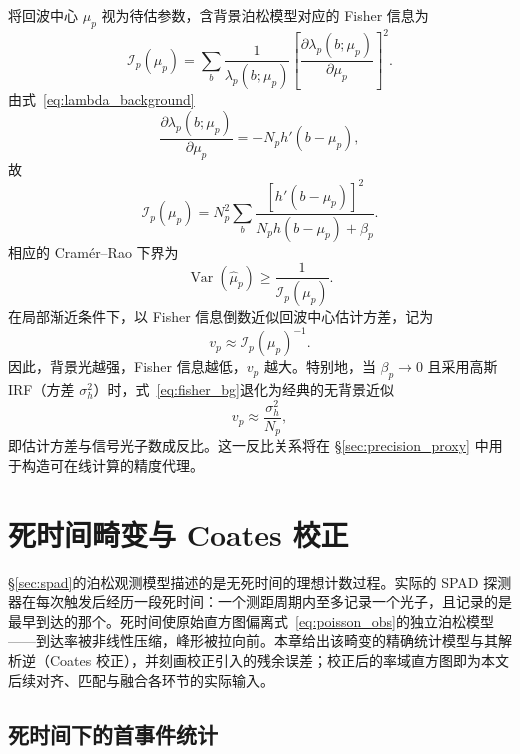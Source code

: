 \documentclass[11pt,a4paper]{ctexart}
\numberwithin{equation}{section}
\newcommand{\Var}{\operatorname{Var}}
\begin{document}
将回波中心 $\mu_p$ 视为待估参数，含背景泊松模型对应的 Fisher 信息为
\begin{equation}
    \mathcal I_p(\mu_p)
    =
    \sum_b
    \frac{1}{\lambda_p(b;\mu_p)}
    \left[
    \frac{\partial\lambda_p(b;\mu_p)}{\partial\mu_p}
    \right]^2.
    \label{eq:fisher_general_bg}
\end{equation}
由式~\eqref{eq:lambda_background}
\begin{equation}
    \frac{\partial\lambda_p(b;\mu_p)}{\partial\mu_p}
    =
    -N_p h'(b-\mu_p),
    \label{eq:lambda_derivative}
\end{equation}
故
\begin{equation}
    \mathcal I_p(\mu_p)
    =
    N_p^2
    \sum_b
    \frac{[h'(b-\mu_p)]^2}
    {N_p h(b-\mu_p)+\beta_p}.
    \label{eq:fisher_bg}
\end{equation}
相应的 Cram\'er--Rao 下界为
\begin{equation}
    \Var(\hat\mu_p)
    \geq
    \frac{1}{\mathcal I_p(\mu_p)}.
    \label{eq:crlb_bg}
\end{equation}
在局部渐近条件下，以 Fisher 信息倒数近似回波中心估计方差，记为
\begin{equation}
    \boxed{
    v_p
    \approx
    \mathcal I_p(\mu_p)^{-1}
    }.
    \label{eq:v_from_fisher}
\end{equation}
因此，背景光越强，Fisher 信息越低，$v_p$ 越大。特别地，当 $\beta_p\rightarrow0$ 且采用高斯 IRF（方差 $\sigma_h^2$）时，式~\eqref{eq:fisher_bg}退化为经典的无背景近似
\begin{equation}
    v_p\approx\frac{\sigma_h^2}{N_p},
    \label{eq:v_classical}
\end{equation}
即估计方差与信号光子数成反比。这一反比关系将在 \S\ref{sec:precision_proxy} 中用于构造可在线计算的精度代理。

\section{死时间畸变与 Coates 校正}
\label{sec:coates}

\S\ref{sec:spad}的泊松观测模型描述的是无死时间的理想计数过程。实际的 SPAD 探测器在每次触发后经历一段死时间：一个测距周期内至多记录一个光子，且记录的是最早到达的那个。死时间使原始直方图偏离式~\eqref{eq:poisson_obs}的独立泊松模型——到达率被非线性压缩，峰形被拉向前。本章给出该畸变的精确统计模型与其解析逆（Coates 校正），并刻画校正引入的残余误差；校正后的率域直方图即为本文后续对齐、匹配与融合各环节的实际输入。

\subsection{死时间下的首事件统计}
\end{document}
